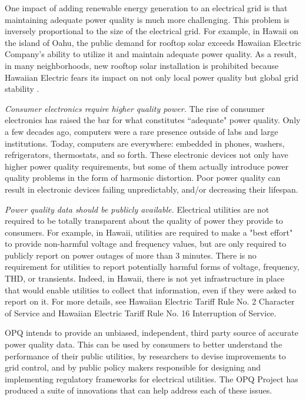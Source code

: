 \documentclass[preprints,article,accept,moreauthors,pdftex]{Definitions/mdpi}
\begin{document}
One impact of adding renewable energy generation to an electrical grid is that maintaining adequate power quality is much more challenging. This problem is inversely proportional to the size of the electrical grid. For example, in Hawaii on the island of Oahu, the public demand for rooftop solar exceeds Hawaiian Electric Company's ability to utilize it and maintain adequate power quality. As a result, in many neighborhoods, new rooftop solar installation is prohibited because Hawaiian Electric fears its impact on not only local power quality but global grid stability \cite{TBD}.

{\em Consumer electronics require higher quality power.} The rise of consumer electronics has raised the bar for what constitutes ``adequate" power quality. Only a few decades ago, computers were a rare presence outside of labs and large institutions. Today, computers are everywhere: embedded in phones, washers, refrigerators, thermostats, and so forth. These electronic devices not only have higher power quality requirements, but some of them actually introduce power quality problems in the form of harmonic distortion. Poor power quality can result in electronic devices failing unpredictably, and/or decreasing their lifespan.

{\em Power quality data should be publicly available.} Electrical utilities are not required to be totally transparent about the quality of power they provide to consumers. For example, in Hawaii, utilities are required to make a "best effort" to provide non-harmful voltage and frequency values, but are only required to publicly report on power outages of more than 3 minutes. There is no requirement for utilities to report potentially harmful forms of voltage, frequency, THD, or transients. Indeed, in Hawaii, there is not yet infrastructure in place that would enable utilities to collect that information, even if they were asked to report on it. For more details, see Hawaiian Electric Tariff Rule No. 2 Character of Service and Hawaiian Electric Tariff Rule No. 16 Interruption of Service.

OPQ intends to provide an unbiased, independent, third party source of accurate power quality data. This can be used by consumers to better understand the performance of their public utilities, by researchers to devise improvements to grid control, and by public policy makers responsible for designing and implementing regulatory frameworks for electrical utilities.  The OPQ Project has produced a suite of innovations that can help address each of these issues.
\end{document}
